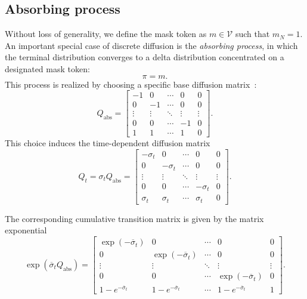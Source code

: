     \subsection{Absorbing process}
        \label{app:absorbing process}
        Without loss of generality, we define the mask token as $m \in \mathcal{V}$ such that $m_N = 1$. An important special case of discrete diffusion is the \textit{absorbing process}, in which the terminal distribution converges to a delta distribution concentrated on a designated mask token: $$\pi = m.$$ This process is realized by choosing a specific base diffusion matrix~\citep{lou2024discrete}:
        \begin{equation}
            Q_{\text{abs}} =
            \begin{bmatrix}
                -1 & 0 & \cdots & 0 & 0 \\
                0 & -1 & \cdots & 0 & 0 \\
                \vdots & \vdots & \ddots & \vdots & \vdots \\
                0 & 0 & \cdots & -1 & 0 \\
                1 & 1 & \cdots & 1 & 0
            \end{bmatrix}.
        \end{equation}
        This choice induces the time-dependent diffusion matrix
        \begin{equation}
            \label{eq: absorbing diffusion matrix}
            Q_t = \sigma_t Q_{\text{abs}} =
            \begin{bmatrix}
                -\sigma_t & 0 & \cdots & 0 & 0 \\
                0 & -\sigma_t & \cdots & 0 & 0 \\
                \vdots & \vdots & \ddots & \vdots & \vdots \\
                0 & 0 & \cdots & -\sigma_t & 0 \\
                \sigma_t & \sigma_t & \cdots & \sigma_t & 0
            \end{bmatrix}.
        \end{equation}
        
        The corresponding cumulative transition matrix is given by the matrix exponential
        \begin{equation}
            \exp(\overline{\sigma}_t Q_{\text{abs}}) =
            \begin{bmatrix}
                \exp(-\overline{\sigma}_t) & 0 & \cdots & 0 & 0 \\
                0 & \exp(-\overline{\sigma}_t) & \cdots & 0 & 0 \\
                \vdots & \vdots & \ddots & \vdots & \vdots \\
                0 & 0 & \cdots & \exp(-\overline{\sigma}_t) & 0 \\
                1 - e^{-\overline{\sigma}_t} & 1 - e^{-\overline{\sigma}_t} & \cdots & 1 - e^{-\overline{\sigma}_t} & 1
            \end{bmatrix}.
        \end{equation}
        
